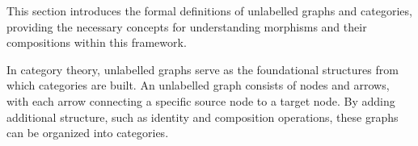 This section introduces the formal definitions of unlabelled graphs and categories, providing the necessary concepts for understanding morphisms and their compositions within this framework. 

In category theory, unlabelled graphs serve as the foundational structures from which categories are built. An unlabelled graph consists of nodes and arrows, with each arrow connecting a specific source node to a target node. By adding additional structure, such as identity and composition operations, these graphs can be organized into categories. 






 